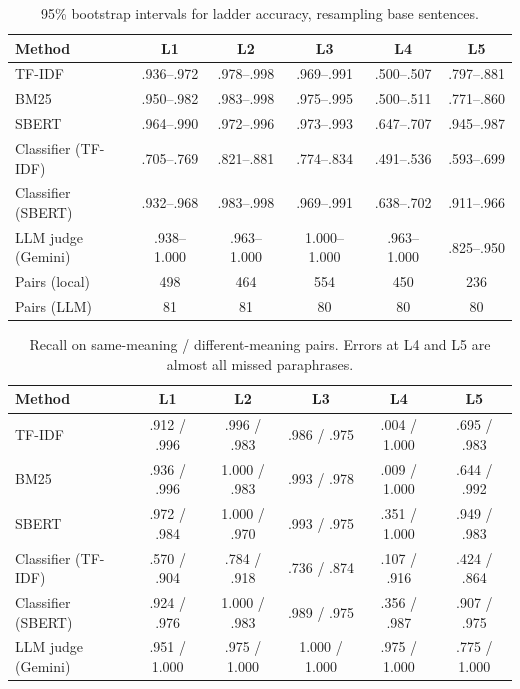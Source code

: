 \documentclass[11pt]{article}
\begin{document}
\begin{table}[t]
\centering\small
\begin{tabular}{@{}lccccc@{}}
\toprule
\textbf{Method} & \textbf{L1} & \textbf{L2} & \textbf{L3} & \textbf{L4} & \textbf{L5} \\
\midrule
TF-IDF & .936--.972 & .978--.998 & .969--.991 & .500--.507 & .797--.881 \\
BM25 & .950--.982 & .983--.998 & .975--.995 & .500--.511 & .771--.860 \\
SBERT & .964--.990 & .972--.996 & .973--.993 & .647--.707 & .945--.987 \\
Classifier (TF-IDF) & .705--.769 & .821--.881 & .774--.834 & .491--.536 & .593--.699 \\
Classifier (SBERT) & .932--.968 & .983--.998 & .969--.991 & .638--.702 & .911--.966 \\
LLM judge (Gemini) & .938--1.000 & .963--1.000 & 1.000--1.000 & .963--1.000 & .825--.950 \\
\midrule
Pairs (local) & 498 & 464 & 554 & 450 & 236 \\
Pairs (LLM) & 81 & 81 & 80 & 80 & 80 \\
\bottomrule
\end{tabular}
\caption{95\% bootstrap intervals for ladder accuracy, resampling base sentences.}
\label{tab:ci}
\end{table}

\begin{table}[t]
\centering\small
\begin{tabular}{@{}lccccc@{}}
\toprule
\textbf{Method} & \textbf{L1} & \textbf{L2} & \textbf{L3} & \textbf{L4} & \textbf{L5} \\
\midrule
TF-IDF & .912 / .996 & .996 / .983 & .986 / .975 & .004 / 1.000 & .695 / .983 \\
BM25 & .936 / .996 & 1.000 / .983 & .993 / .978 & .009 / 1.000 & .644 / .992 \\
SBERT & .972 / .984 & 1.000 / .970 & .993 / .975 & .351 / 1.000 & .949 / .983 \\
Classifier (TF-IDF) & .570 / .904 & .784 / .918 & .736 / .874 & .107 / .916 & .424 / .864 \\
Classifier (SBERT) & .924 / .976 & 1.000 / .983 & .989 / .975 & .356 / .987 & .907 / .975 \\
LLM judge (Gemini) & .951 / 1.000 & .975 / 1.000 & 1.000 / 1.000 & .975 / 1.000 & .775 / 1.000 \\
\bottomrule
\end{tabular}
\caption{Recall on same-meaning / different-meaning pairs. Errors at L4 and L5 are almost all missed paraphrases.}
\label{tab:recall}
\end{table}
\end{document}
